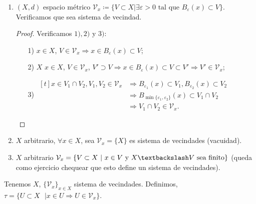 \documentclass[a4paper]{report}
\begin{document}
	\begin{eg}
		\begin{enumerate}
			\item $(X,d)$ espacio métrico $\mathcal{V}_x \coloneq \{ V \subset X | \exists \varepsilon > 0 \text{ tal que } B_{\varepsilon} (x) \subset V \}$. Verificamos que sea sistema de vecindad.

			\begin{proof}[Proof]
				Verificamos $1),2)$ y $3)$:
				\begin{enumerate}
					\item[1)] $x \in X$, $V \in \mathcal{V}_x \Rightarrow x \in B_{\varepsilon} (x) \subset V$;

					\item[2)] $X$ $x \in X$, $V \in \mathcal{V}_x$, $V' \supset V \Rightarrow x \in B_{\varepsilon} (x) \subset V \subset V' \Rightarrow V' \in \mathcal{V}_x$;

					\item[3)] $\begin{aligned}[t]
						x \in V_1 \cap V_2, V_1,V_2 \in \mathcal{V}_x & \Rightarrow B_{\varepsilon_1} (x) \subset V_1, B_{\varepsilon_2} (x) \subset V_2  \\ & \Rightarrow B_{\min \{ \varepsilon_1, \varepsilon_2 \}} (x) \subset V_1 \cap V_2 \\ & \Rightarrow V_1 \cap V_2 \in \mathcal{V}_x.
					\end{aligned}$
				\end{enumerate}
			\end{proof}

			\item $X$ arbitrario, $\forall x \in X$, sea $\mathcal{V}_x = \{ X \}$ es sistema de vecindades (vacuidad).

			\item $X$ arbitrario $\mathcal{V}_x = \{ V \subset X \text{ } | \text{ } x \in V \text{ y } X \textbackslash V \text{ sea finito} \}$ (queda como ejercicio chequear que esto define un sistema de vecindades).  
		\end{enumerate}
	\end{eg}

	\begin{definition}
		Tenemos $X$, $\{ \mathcal{V}_x \}_{x \in X}$ sistema de vecindades. Definimos, $\tau = \{ U \subset X \text{ } | x \in U \Rightarrow U \in \mathcal{V}_x \}$.    
	\end{definition}
\end{document}
